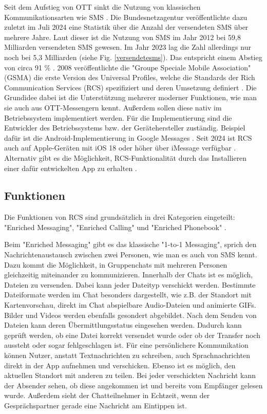 \documentclass[conference]{IEEEtran}
\begin{document}
Seit dem Aufstieg von OTT sinkt die Nutzung von klassischen Kommunikationsarten wie SMS \cite{ottmobinter}.
Die Bundesnetzagentur veröffentlichte dazu zuletzt im Juli 2024 eine Statistik über die Anzahl der versendeten SMS über mehrere Jahre.
Laut dieser ist die Nutzung von SMS im Jahr 2012 bei 59,8 Milliarden versendeten SMS gewesen.
Im Jahr 2023 lag die Zahl allerdings nur noch bei 5,3 Milliarden (siehe Fig. \ref{versendetesms}).
Das entspricht einem Abstieg von circa 91 \% \cite{smsstats}.
2008 veröffentlichte die "Groupe Speciale Mobile Association" (GSMA) die erste Version des Universal Profiles, welche die Standards der Rich Communication Services (RCS) spezifiziert und deren Umsetzung definiert \cite{rcsuite}.
Die Grundidee dabei ist die Unterstützung mehrerer moderner Funktionen, wie man sie auch aus OTT-Messengern kennt.
Außerdem sollen diese nativ im Betriebssystem implementiert werden.
Für die Implementierung sind die Entwickler des Betriebssystems bzw. der Gerätehersteller zuständig.
Beispiel dafür ist die Android-Implementierung in Google Messages \cite{googlemessages}.
Seit 2024 ist RCS auch auf Apple-Geräten mit iOS 18 oder höher über iMessage verfügbar \cite{applemessages}.
Alternativ gibt es die Möglichkeit, RCS-Funktionalität durch das Installieren einer dafür entwickelten App zu erhalten \cite{uniprof}.

\subsection{Funktionen}

Die Funktionen von RCS sind grundsätzlich in drei Kategorien eingeteilt: "Enriched Messaging", "Enriched Calling" und "Enriched Phonebook" \cite{rcsuite,uniprof}.

Beim "Enriched Messaging" gibt es das klassische "1-to-1 Messaging", sprich den Nachrichtenaustausch zwischen zwei Personen, wie man es auch von SMS kennt.
Dazu kommt die Möglichkeit, in Gruppenchats mit mehreren Personen gleichzeitig miteinander zu kommunizieren.
Innerhalb der Chats ist es möglich, Dateien zu versenden.
Dabei kann jeder Dateityp verschickt werden. Bestimmte Dateiformate werden im Chat besonders dargestellt, wie z.B. der Standort mit Kartenvorschau, direkt im Chat abspielbare Audio-Dateien und animierte GIFs.
Bilder und Videos werden ebenfalls gesondert abgebildet.
Nach dem Senden von Dateien kann deren Übermittlungsstatus eingesehen werden.
Dadurch kann geprüft werden, ob eine Datei korrekt versendet wurde oder ob der Transfer noch aussteht oder sogar fehlgeschlagen ist.
Für eine persönlichere Kommunikation können Nutzer, anstatt Textnachrichten zu schreiben, auch Sprachnachrichten direkt in der App aufnehmen und verschicken.
Ebenso ist es möglich, den aktuellen Standort mit anderen zu teilen.
Bei jeder verschickten Nachricht kann der Absender sehen, ob diese angekommen ist und bereits vom Empfänger gelesen wurde.
Außerdem sieht der Chatteilnehmer in Echtzeit, wenn der Gesprächspartner gerade eine Nachricht am Eintippen ist.
\end{document}
